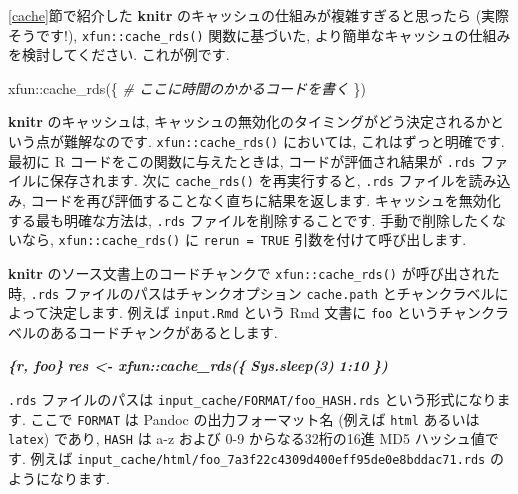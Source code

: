 \documentclass[
  11pt,
  lualatex,ja=standard,jafont=noto]{bxjsreport}
\newenvironment{Shaded}{\begin{snugshade}}{\end{snugshade}}
\newcommand{\CommentTok}[1]{\textcolor[rgb]{0.56,0.35,0.01}{\textit{#1}}}
\newcommand{\FunctionTok}[1]{\textcolor[rgb]{0.00,0.00,0.00}{#1}}
\newcommand{\InformationTok}[1]{\textcolor[rgb]{0.56,0.35,0.01}{\textbf{\textit{#1}}}}
\newcommand{\NormalTok}[1]{#1}
\newcommand{\SpecialCharTok}[1]{\textcolor[rgb]{0.00,0.00,0.00}{#1}}
\begin{document}
\ref{cache}節で紹介した \textbf{knitr} のキャッシュの仕組みが複雑すぎると思ったら (実際そうです!), \texttt{xfun::cache\_rds()} 関数に基づいた, より簡単なキャッシュの仕組みを検討してください. これが例です.

\begin{Shaded}
\begin{Highlighting}[numbers=left,,]
\NormalTok{xfun}\SpecialCharTok{::}\FunctionTok{cache\_rds}\NormalTok{(\{}
  \CommentTok{\# ここに時間のかかるコードを書く}
\NormalTok{\})}
\end{Highlighting}
\end{Shaded}

\textbf{knitr} のキャッシュは, キャッシュの無効化のタイミングがどう決定されるかという点が難解なのです. \texttt{xfun::cache\_rds()} においては, これはずっと明確です. 最初に R コードをこの関数に与えたときは, コードが評価され結果が \texttt{.rds} ファイルに保存されます. 次に \texttt{cache\_rds()} を再実行すると, \texttt{.rds} ファイルを読み込み, コードを再び評価することなく直ちに結果を返します. キャッシュを無効化する最も明確な方法は, \texttt{.rds} ファイルを削除することです. 手動で削除したくないなら, \texttt{xfun::cache\_rds()} に \texttt{rerun = TRUE} 引数を付けて呼び出します.

\textbf{knitr} のソース文書上のコードチャンクで \texttt{xfun::cache\_rds()} が呼び出された時, \texttt{.rds} ファイルのパスはチャンクオプション \texttt{cache.path} とチャンクラベルによって決定します. 例えば \texttt{input.Rmd} という Rmd 文書に \texttt{foo} というチャンクラベルのあるコードチャンクがあるとします.

\begin{Shaded}
\begin{Highlighting}[]
\InformationTok{\textasciigrave{}\textasciigrave{}\textasciigrave{}\{r, foo\}}
\InformationTok{res \textless{}{-} xfun::cache\_rds(\{}
\InformationTok{  Sys.sleep(3)}
\InformationTok{  1:10}
\InformationTok{\})}
\InformationTok{\textasciigrave{}\textasciigrave{}\textasciigrave{}}
\end{Highlighting}
\end{Shaded}

\texttt{.rds} ファイルのパスは \texttt{input\_cache/FORMAT/foo\_HASH.rds} という形式になります. ここで \texttt{FORMAT} は Pandoc の出力フォーマット名 (例えば \texttt{html} あるいは \texttt{latex}) であり, \texttt{HASH} は a-z および 0-9 からなる32桁の16進 MD5 ハッシュ値です. 例えば \texttt{input\_cache/html/foo\_7a3f22c4309d400eff95de0e8bddac71.rds} のようになります.
\end{document}
